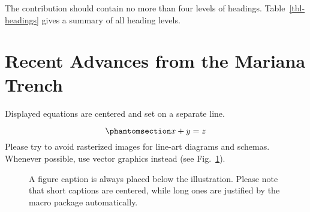 \documentclass[runningheads]{llncs}
\begin{document}
The contribution should contain no more than four levels of headings.
Table~\ref{tbl-headings} gives a summary of all heading levels.

\begin{table}[t]

\caption{\label{tbl-headings}Table captions should be placed above the
tables.}


\end{table}%

\section{Recent Advances from the Mariana
Trench}\label{recent-advances-from-the-mariana-trench}

Displayed equations are centered and set on a separate line.

\begin{equation}\phantomsection\label{eq-linear}{
x + y = z
}\end{equation} Please try to avoid rasterized images for line-art
diagrams and schemas. Whenever possible, use vector graphics instead
(see Fig.~\ref{fig-duck}).

\begin{figure}[t]


\caption{\label{fig-duck}A figure caption is always placed below the
illustration. Please note that short captions are centered, while long
ones are justified by the macro package automatically.}

\end{figure}%
\end{document}
